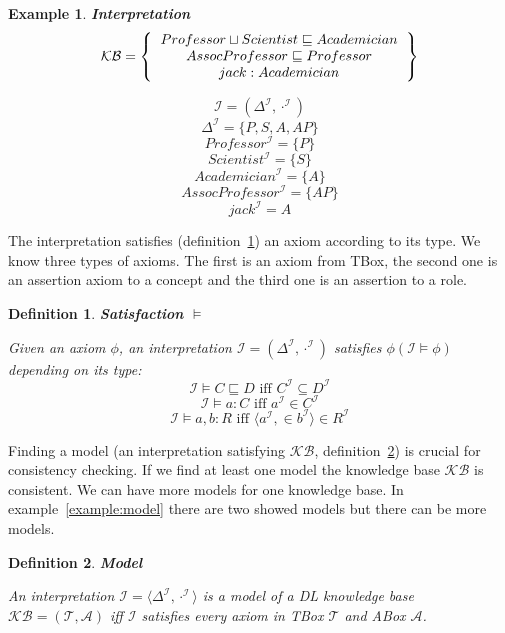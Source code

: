 \documentclass[12pt,a4paper]{article}
\newtheorem{definition}{Definition}[subsection]
\newtheorem{example}{Example}[subsection]
\begin{document}
\newpage
\begin{example}{\textbf{Interpretation}}
	\[ 
	\mathcal{KB} = \left\{
	\begin{tabular}{c c}
	$Professor \sqcup Scientist \sqsubseteq Academician$ \\
	$AssocProfessor \sqsubseteq Professor$ \\
	$jack : Academician$ \\
	\end{tabular}
	\right \}
	\]
	
	\[ \mathcal{I} = (\Delta ^{\mathcal{I}}, \cdot^{\mathcal{I}}) \]
	\[ \Delta ^{\mathcal{I}} = \{ P,S,A,AP \} \]
	\[ Professor^{\mathcal{I}} = \{P\} \]
	\[ Scientist^{\mathcal{I}} = \{S\} \]
	\[ Academician^{\mathcal{I}} = \{A\} \]
	\[ AssocProfessor^{\mathcal{I}} = \{AP\} \]
	\[ jack^{\mathcal{I}} = A \]
	
\end{example}

The interpretation satisfies (definition~\ref{def:satisfaction}) an axiom according to its type. We know three types of axioms. The first is an axiom from TBox, the second one is an assertion axiom to a concept and the third one is an assertion to a role.

\begin{definition}{\textbf{Satisfaction $\models$}}
	\label{def:satisfaction}

	Given an axiom $\phi$, an interpretation $\mathcal{I} = (\Delta^{\mathcal{I}}, \cdot ^{\mathcal{I}})$ satisfies $\phi (\mathcal{I} \models \phi)$ depending on its type:
	\[ \mathcal{I} \models C \sqsubseteq D \text{ iff } C^{\mathcal{I}} \subseteq D^{\mathcal{I}} \]
	\[ \mathcal{I} \models a:C \text{ iff } a^{\mathcal{I}} \in C^{\mathcal{I}} \]
	\[ \mathcal{I} \models a,b:R \text{ iff } \langle a^{\mathcal{I}}, \in b^{\mathcal{I}} \rangle \in R^{\mathcal{I}} \]	
\end{definition}

Finding a model (an interpretation satisfying $\mathcal{KB}$, definition~\ref{def:model}) is crucial for consistency checking. If we find at least one model the knowledge base $\mathcal{KB}$ is consistent. We can have more models for one knowledge base. In example~\ref{example:model} there are two showed models but there can be more models. 

\begin{definition}{\textbf{Model}}
	\label{def:model}

	An interpretation $\mathcal{I} = \langle \Delta^{\mathcal{I}}, \cdot ^{\mathcal{I}}  \rangle$ is a model of a DL knowledge base $\mathcal{KB} = (\mathcal{T}, \mathcal{A})$ iff $\mathcal{I}$ satisfies every axiom in TBox $\mathcal{T}$ and ABox $\mathcal{A}$.
\end{definition}
\end{document}
